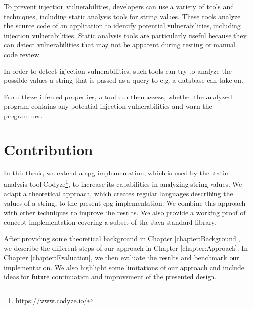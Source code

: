 To prevent injection vulnerabilities, developers can use a variety of tools and techniques, including static analysis tools for string values. These tools analyze the source code of an application to identify potential vulnerabilities, including injection vulnerabilities. Static analysis tools are particularly useful because they can detect vulnerabilities that may not be apparent during testing or manual code review.

In order to detect injection vulnerabilities, such tools can try to analyze the possible values a string that is passed as a query to e.g. a database can take on.

From these inferred properties, a tool can then assess, whether the analyzed program contains any potential injection vulnerabilities and warn the programmer.

\section{Contribution}

In this thesis, we extend a \acf{cpg} implementation, which is used by the static analysis tool Codyze\footnote{https://www.codyze.io/}, to increase its capabilities in analyzing string values. We adapt a theoretical approach\cite{brics}, which creates regular languages describing the values of a string, to the present \ac{cpg} implementation. We combine this approach with other techniques\cite{nederhof}\cite{delgado} to improve the results. We also provide a working proof of concept implementation covering a subset of the Java standard library.

After providing some theoretical background in Chapter \ref{chapter:Background}, we describe the different steps of our approach in Chapter \ref{chapter:Approach}.
In Chapter \ref{chapter:Evaluation}, we then evaluate the results and benchmark our implementation. We also highlight some limitations of our approach and include ideas for future continuation and improvement of the presented design.
